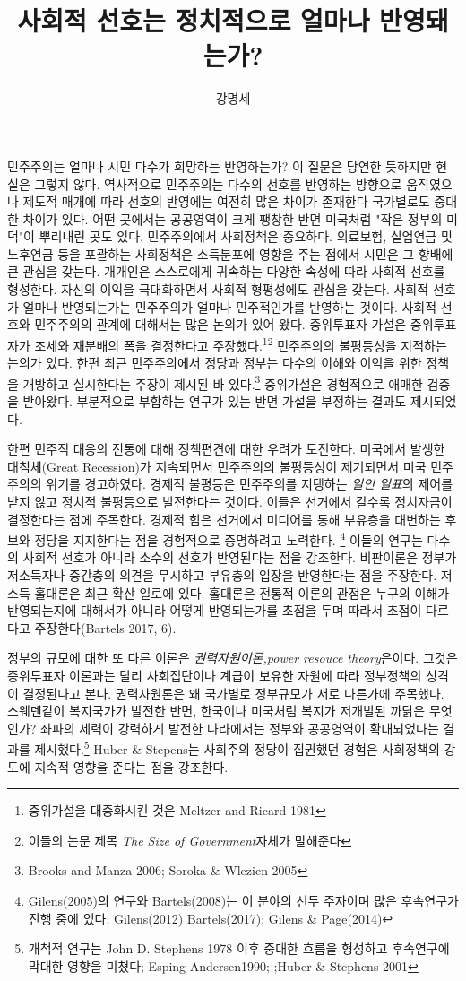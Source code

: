 \documentclass[12pt,a4paper]{book}
\author{강명세}
\title{사회적 선호는 정치적으로 얼마나 반영돼는가?}
\begin{document}
민주주의는  얼마나 시민 다수가 희망하는 반영하는가? 이 질문은 당연한 듯하지만 현실은 그렇지 않다. 역사적으로 민주주의는 다수의 선호를 반영하는 방향으로 움직였으나 제도적 매개에 따라 선호의 반영에는 여전히 많은 차이가 존재한다 국가별로도 중대한 차이가 있다. 어떤 곳에서는 공공영역이 크게 팽창한 반면 미국처럼 "작은 정부의 미덕"이 뿌리내린 곳도 있다. 
민주주의에서 사회정책은 중요하다. 의료보험, 실업연금 및 노후연금 등을 포괄하는 사회정책은 소득분포에 영향을 주는 점에서 시민은 그 향배에 큰 관심을 갖는다. 개개인은 스스로에게 귀속하는 다양한 속성에 따라  사회적 선호를 형성한다. 자신의 이익을 극대화하면서 사회적 형평성에도 관심을 갖는다. 사회적 선호가 얼마나 반영되는가는 민주주의가 얼마나 민주적인가를 반영하는 것이다.  사회적 선호와 민주주의의 관계에 대해서는 많은 논의가 있어 왔다. 중위투표자 가설은 중위투표자가 조세와 재분배의 폭을 결정한다고 주장했다.\footnote{중위가설을 대중화시킨 것은 Meltzer and Ricard 1981}\footnote{ 이들의 논문 제목 \textit{The Size of Government}자체가 말해준다} 민주주의의 불평등성을 지적하는 논의가 있다. 한편 최근  민주주의에서 정당과 정부는 다수의 이해와 이익을 위한 정책을 개방하고 실시한다는 주장이 제시된 바 있다.\footnote{Brooks and Manza 2006; Soroka \& Wlezien 2005} 중위가설은 경험적으로 애매한 검증을 받아왔다. 부분적으로 부합하는 연구가 있는 반면 가설을 부정하는 결과도 제시되었다. 

한편 민주적 대응의 전통에 대해 정책편견에 대한 우려가 도전한다. 미국에서 발생한 대침체(Great Recession)가 지속되면서 민주주의의 불평등성이 제기되면서 미국 민주주의의 위기를 경고하였다. 경제적 불평등은 민주주의를 지탱하는 \textit{일인 일표}의 제어를 받지 않고 정치적 불평등으로 발전한다는 것이다. 이들은 선거에서 갈수록 정치자금이 결정한다는 점에 주목한다. 경제적 힘은 선거에서 미디어를 통해 부유층을 대변하는 후보와 정당을 지지한다는 점을 경험적으로 증명하려고 노력한다. \footnote{Gilens(2005)의 연구와 Bartels(2008)는 이 분야의 선두 주자이며 많은 후속연구가 진행 중에 있다:  Gilens(2012) Bartels(2017); Gilens \& Page(2014)} 이들의 연구는 다수의 사회적 선호가 아니라 소수의 선호가 반영된다는 점을 강조한다. 비판이론은 정부가 저소득자나 중간층의 의견을 무시하고 부유층의 입장을 반영한다는 점을 주장한다. 저소득  홀대론은 최근 확산 일로에 있다.  홀대론은 전통적 이론의 관점은 누구의 이해가 반영되는지에 대해서가 아니라 어떻게 반영되는가를 초점을 두며 따라서 초점이 다르다고 주장한다(Bartels 2017, 6).

정부의 규모에 대한 또 다른 이론은 \textit{권력자원이론,power resouce theory}은이다. 그것은 중위투표자 이론과는 달리  사회집단이나 계급이 보유한 자원에 따라 정부정책의 성격이 결정된다고 본다. 권력자원론은 왜 국가별로 정부규모가 서로 다른가에 주목했다. 스웨덴같이 복지국가가 발전한 반면, 한국이나 미국처럼 복지가 저개발된 까닭은 무엇인가? 좌파의 세력이 강력하게 발전한 나라에서는 정부와 공공영역이 확대되었다는 결과를 제시했다.\footnote{개척적 연구는 John D. Stephens 1978 이후 중대한 흐름을 형성하고 후속연구에 막대한 영향을 미쳤다; Esping-Andersen1990; ;Huber \& Stephens 2001} Huber \& Stepens는 사회주의 정당이 집권했던 경험은 사회정책의 강도에 지속적 영향을 준다는 점을 강조한다. 
\end{document}
